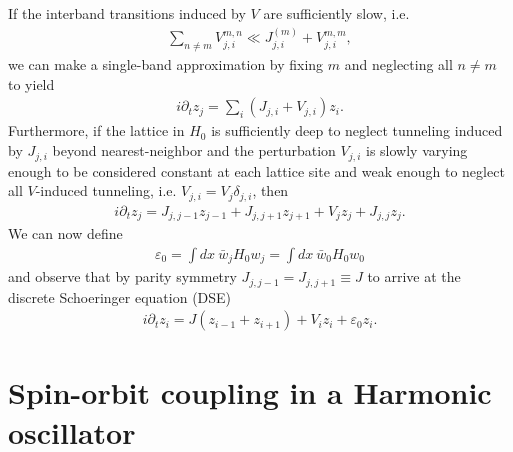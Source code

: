 \documentclass[aps,notitlepage,nofootinbib,10pt]{revtex4-1}
\newcommand{\p}[1]{\left(#1\right)} %
\renewcommand{\d}{\partial} %
\newcommand{\1}{\mathds{1}}
\begin{document}
If the interband transitions induced by $V$ are sufficiently slow,
i.e.
\begin{align}
  \sum_{n\ne m}V_{j,i}^{m,n}\ll J_{j,i}^{\p m}+V_{j,i}^{m,m},
\end{align}
we can make a single-band approximation by fixing $m$ and neglecting
all $n\ne m$ to yield
\begin{align}
  i\d_t z_j = \sum_i \p{J_{j,i} + V_{j,i}}z_i.
\end{align}
Furthermore, if the lattice in $H_0$ is sufficiently deep to neglect
tunneling induced by $J_{j,i}$ beyond nearest-neighbor and the
perturbation $V_{j,i}$ is slowly varying enough to be considered
constant at each lattice site and weak enough to neglect all
$V$-induced tunneling, i.e. $V_{j,i}=V_j\delta_{j,i}$, then
\begin{align}
  i\d_t z_j
  = J_{j,j-1}z_{j-1} + J_{j,j+1}z_{j+1} + V_jz_j + J_{j,j}z_j.
\end{align}
We can now define
\begin{align}
  \varepsilon_0
  = \int dx~ \bar w_j H_0 w_j
  = \int dx~ \bar w_0 H_0 w_0
\end{align}
and observe that by parity symmetry $J_{j,j-1}=J_{j,j+1}\equiv J$ to
arrive at the discrete Schoeringer equation (DSE)
\begin{align}
  i\d_t z_i
  = J\p{z_{i-1} + z_{i+1}} + V_i z_i + \varepsilon_0 z_i.
\end{align}


\newpage
\section{Spin-orbit coupling in a Harmonic oscillator}
\end{document}
